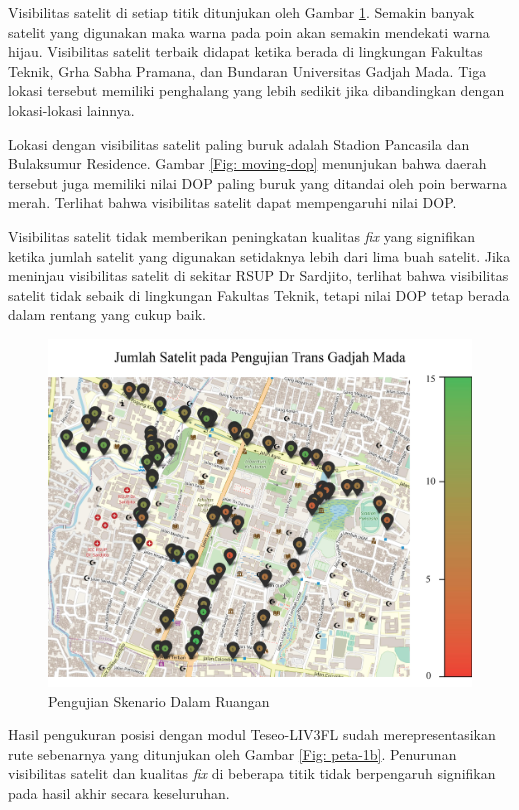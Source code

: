 Visibilitas satelit di setiap titik ditunjukan oleh Gambar \ref{Fig: moving-sats}. Semakin banyak satelit yang digunakan maka warna pada poin akan semakin mendekati warna hijau. Visibilitas satelit terbaik didapat ketika berada di lingkungan Fakultas Teknik, Grha Sabha Pramana, dan Bundaran Universitas Gadjah Mada. Tiga lokasi tersebut memiliki penghalang yang lebih sedikit jika dibandingkan dengan lokasi-lokasi lainnya.

Lokasi dengan visibilitas satelit paling buruk adalah Stadion Pancasila dan Bulaksumur Residence. Gambar \ref{Fig: moving-dop} menunjukan bahwa daerah tersebut juga memiliki nilai DOP paling buruk yang ditandai oleh poin berwarna merah. Terlihat bahwa visibilitas satelit dapat mempengaruhi nilai DOP. 

Visibilitas satelit tidak memberikan peningkatan kualitas \textit{fix} yang signifikan ketika jumlah satelit yang digunakan setidaknya lebih dari lima buah satelit. Jika meninjau visibilitas satelit di sekitar RSUP Dr Sardjito, terlihat bahwa visibilitas satelit tidak sebaik di lingkungan Fakultas Teknik, tetapi nilai DOP tetap berada dalam rentang yang cukup baik.

\begin{figure}[H]
	\centering
	\includegraphics[width=12cm]{contents/chapter-4/pengujian-bergerak/moving-sats.jpg}
	\caption{Pengujian Skenario Dalam Ruangan}
	\label{Fig: moving-sats}
\end{figure}

Hasil pengukuran posisi dengan modul Teseo-LIV3FL sudah merepresentasikan rute sebenarnya yang ditunjukan oleh Gambar \ref{Fig: peta-1b}. Penurunan visibilitas satelit dan kualitas \textit{fix} di beberapa titik tidak berpengaruh signifikan pada hasil akhir secara keseluruhan.